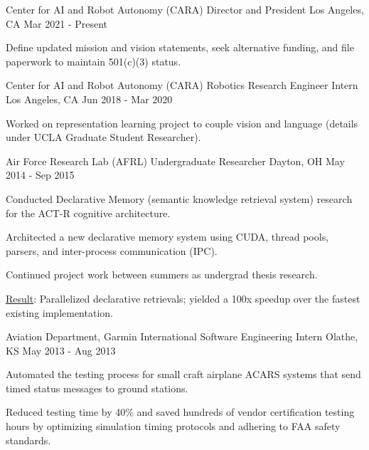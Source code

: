 


\begin{cventries}

\cventry
{Center for AI and Robot Autonomy (CARA)}
{Director and President}
{Los Angeles, CA}
{Mar 2021 - Present}
{
\begin{cvitems}
\item Define updated mission and vision statements, seek alternative funding, and file paperwork to maintain 501(c)(3) status.
\end{cvitems}
}

\cventry
{Center for AI and Robot Autonomy (CARA)}
{Robotics Research Engineer Intern}
{Los Angeles, CA}
{Jun 2018 - Mar 2020}
{
\begin{cvitems}
\item Worked on representation learning project to couple vision and language (details under UCLA Graduate Student Researcher).
\end{cvitems}
}

\cventry
{Air Force Research Lab (AFRL)}
{Undergraduate Researcher}
{Dayton, OH}
{May 2014 - Sep 2015}
{
\begin{cvitems}
\item Conducted Declarative Memory (semantic knowledge retrieval system) research for the ACT-R cognitive architecture.
\item Architected a new declarative memory system using CUDA, thread pools, parsers, and inter-process communication (IPC).
\item Continued project work between summers as undergrad thesis research.
\item \underline{Result}: Parallelized declarative retrievals; yielded a 100x speedup over the fastest existing implementation.
\end{cvitems}
}

\cventry
{Aviation Department, Garmin International}
{Software Engineering Intern}
{Olathe, KS}
{May 2013 - Aug 2013}
{
\begin{cvitems}
\item Automated the testing process for small craft airplane ACARS systems that send timed status messages to ground stations.
\item Reduced testing time by 40\% and saved hundreds of vendor certification testing hours by optimizing simulation timing protocols and adhering to FAA safety standards.
\end{cvitems}
}

\end{cventries}